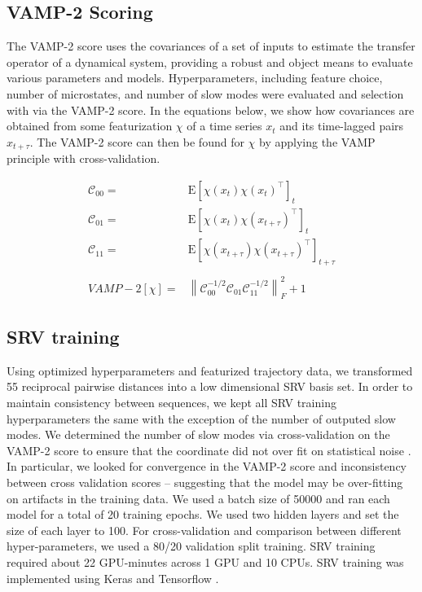 \documentclass[journal=jpcbfk,manuscript=article]{achemso}
\newcommand{\Expect}[1]{\mathrm{E}\left[#1\right]}
\newcommand{\norm}[1]{\left\lVert#1\right\rVert}
\begin{document}
\subsection{VAMP-2 Scoring}
The VAMP-2 score uses the covariances of a set of inputs to estimate the transfer operator of a dynamical system, providing a robust and object means to evaluate various parameters and models. Hyperparameters, including feature choice, number of microstates, and number of slow modes were evaluated and selection with via the VAMP-2 score. In the equations below, we show how covariances are obtained from some featurization $\chi$ of a time series $x_t$ and its time-lagged pairs $x_{t+\tau}$. The VAMP-2 score can then be found for $\chi$ by applying the VAMP principle with cross-validation.

\begin{align*}
 	\mathscr{C}_{00}=&\Expect{\chi(x_t)\chi(x_t)^\intercal}_t\\
 	\mathscr{C}_{01}=&\Expect{\chi(x_t)\chi(x_{t+\tau})^\intercal}_t\\
 	\mathscr{C}_{11}=&\Expect{\chi(x_{t+\tau})\chi(x_{t+\tau})^\intercal}_{t+\tau}\\
	\\
 	VAMP-2[\chi]=&\norm{\mathscr{C}_{00}^{-1/2}\mathscr{C}_{01}\mathscr{C}_{11}^{-1/2}}_F^2 +1
\end{align*}\label{CK1}

\subsection{SRV training}

Using optimized hyperparameters and featurized trajectory data, we transformed 55 reciprocal pairwise distances into a low dimensional SRV basis set. In order to maintain consistency between sequences, we kept all SRV training hyperparameters the same with the exception of the number of outputed slow modes. We determined the number of slow modes via cross-validation on the VAMP-2 score to ensure that the coordinate did not over fit on statistical noise \citep{McGibbon2015VariationalKinetics}. In particular, we looked for convergence in the VAMP-2 score and inconsistency between cross validation scores -- suggesting that the model may be over-fitting on artifacts in the training data. We used a batch size of 50000 and ran each model for a total of 20 training epochs. We used two hidden layers and set the size of each layer to 100. For cross-validation and comparison between different hyper-parameters, we used a 80/20 validation split training. SRV training required about 22 GPU-minutes across 1 GPU and 10 CPUs. SRV training was implemented using Keras and Tensorflow \citep{KerasGithub.Com, Abadi2016TensorFlow:Systems}.
\end{document}
